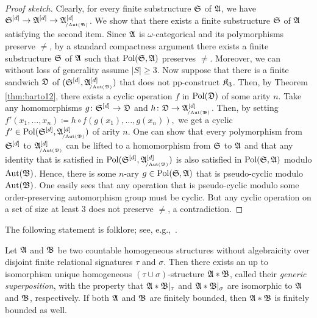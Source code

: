 \begin{proof}[Proof sketch] Clearly, for every finite substructure $\mathfrak{S}$ of $\mathfrak{A}$, we have $ \fpwr{\struct{S}}{d}  \rightarrow \fpwr{\struct{A}}{d} \rightarrow \fpwr{\struct{A}}{d}_{\orbeq{\Aut(\struct{B})}}$.
%
We show that there exists a finite substructure $\mathfrak{S}$ of $\mathfrak{A}$  satisfying the second item. 
%
Since $\mathfrak{A}$ is $\omega$-categorical and its polymorphisms preserve $\neq$, by a standard compactness argument there exists a finite substructure $\mathfrak{S}$ of $\mathfrak{A}$ such that $\mathrm{Pol}(\mathfrak{S},\mathfrak{A})$ preserves $\neq$.
%
Moreover, we can without loss of generality assume $|S|\geq 3$.  
%
Now suppose that there is a finite sandwich $\mathfrak{D}$ of $(\fpwr{\struct{S}}{d},\fpwr{\struct{A}}{d}_{\orbeq{\Aut(\struct{B})}})$ that does not pp-construct $\mathfrak{K}_3$. 
%
Then, by Theorem \ref{thm:barto12}, there exists a cyclic operation $f$ in $\mathrm{Pol}(\mathfrak{D})$ of some arity $n$. 
%
Take any homomorphisms $g\colon {\mathfrak{S}}^{[d]} \rightarrow \mathfrak{D}$ and $h\colon \struct{D} \rightarrow \smash{\fpwr{\struct{A}}{d}_{\orbeq{\Aut(\struct{B})}}}$. 
%
Then, by setting 
%
$
    f'(x_1,\dots,x_n) \coloneqq h\circ f(g(x_1),\dots,g(x_n)),
$
%
we get a cyclic $f'\in \Pol(\fpwr{\struct{S}}{d},\fpwr{\struct{A}}{d}_{\orbeq{\Aut(\struct{B})}})$ of arity $n$.
%
One can show that every polymorphism from ${\mathfrak{S}}^{[d]}$ to $\fpwr{\struct{A}}{d}_{\orbeq{\Aut(\struct{B})}}$ can be lifted to a homomorphism from $\mathfrak{S}$ to $\mathfrak{A}$ and that any identity that is satisfied in $\Pol(\fpwr{\struct{S}}{d},\fpwr{\struct{A}}{d}_{\orbeq{\Aut(\struct{B})}})$ is also satisfied in $\mathrm{Pol}(\mathfrak{S},\mathfrak{A})$ modulo $\mathrm{Aut}(\mathfrak{B})$. 
%
Hence, there is some $n$-ary $g\in\mathrm{Pol}(\mathfrak{S},\mathfrak{A})$ that is pseudo-cyclic modulo $\mathrm{Aut}(\mathfrak{B})$.  
%
One easily sees that any operation that is pseudo-cyclic modulo some order-preserving automorphism group  must be cyclic.
% 
But any cyclic operation on a set of size at least 3 does not preserve $\neq$, a contradiction.
%  
\end{proof} 


The following statement is folklore; see, e.g.,~\cite[Section~2.3.6]{bodirsky2021complexity}.

\begin{proposition} \label{prop:generic_superpositions} Let $\mathfrak{A}$ and $\mathfrak{B}$ be two countable homogeneous structures without algebraicity over disjoint finite relational signatures $\tau$ and $\sigma$. 
%
Then there exists an up to isomorphism unique homogeneous $(\tau\cup \sigma)$-structure $\mathfrak{A}\ast \mathfrak{B}$, called their \emph{generic superposition}, with the property that $\mathfrak{A}\ast \mathfrak{B}|_{\tau}$ and $\mathfrak{A}\ast \mathfrak{B}|_{\sigma}$ are isomorphic to $\mathfrak{A}$ and $\mathfrak{B}$, respectively. If both $\mathfrak{A}$ and $\mathfrak{B}$ are finitely bounded, then $\mathfrak{A}\ast \mathfrak{B}$ is finitely bounded as well.
\end{proposition} 
 
